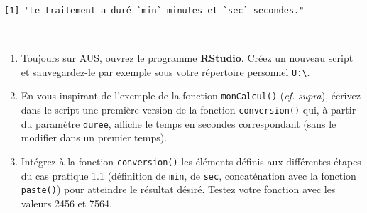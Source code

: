 \documentclass[12pt,twosided, notitlepage]{book}
\newenvironment{Shaded}{}{}
\newcommand{\KeywordTok}[1]{\textcolor[rgb]{0.00,0.00,1.00}{#1}}
\newcommand{\DecValTok}[1]{#1}
\newcommand{\StringTok}[1]{\textcolor[rgb]{0.00,0.50,0.50}{#1}}
\newcommand{\CommentTok}[1]{\textcolor[rgb]{0.00,0.50,0.00}{#1}}
\newcommand{\ControlFlowTok}[1]{\textcolor[rgb]{0.00,0.00,1.00}{#1}}
\newcommand{\NormalTok}[1]{#1}
\newif \ifsol
\renewenvironment{Shaded}{\begin{snugshade}}{\end{snugshade}}
\begin{document}
\begin{verbatim}
[1] "Le traitement a duré `min` minutes et `sec` secondes."
\end{verbatim}

~

\begin{enumerate}
\def\labelenumi{\alph{enumi}.}
\item
  Toujours sur AUS, ouvrez le programme \textbf{RStudio}. Créez un
  nouveau script et sauvegardez-le par exemple sous votre répertoire
  personnel \texttt{U:\textbackslash{}}.
\item
  En vous inspirant de l'exemple de la fonction \texttt{monCalcul()}
  (\emph{cf.} \emph{supra}), écrivez dans le script une première version
  de la fonction \texttt{conversion()} qui, à partir du paramètre
  \texttt{duree}, affiche le temps en secondes correspondant (sans le
  modifier dans un premier temps).

  \ifsol 

  \begin{center} \rule{0.5\linewidth}{\linethickness}\end{center}

\begin{Shaded}
\begin{Highlighting}[]
\CommentTok{# La structure de base d'une définition de fonction est simple :}
\CommentTok{# l'opérateur d'assignation est utilisé pour associer à un nom}
\CommentTok{# le code de la fonction}
\NormalTok{conversion <-}\StringTok{ }\ControlFlowTok{function}\NormalTok{(duree)\{}
  \KeywordTok{return}\NormalTok{(duree)}
\NormalTok{\}}
\CommentTok{# Dans cette première version, on ne fait que renvoyer la valeur}
\CommentTok{# de duree à l'identique.}
\KeywordTok{conversion}\NormalTok{(}\DecValTok{2456}\NormalTok{)}
\NormalTok{  ## [1] 2456}
\end{Highlighting}
\end{Shaded}

  \begin{center} \rule{0.5\linewidth}{\linethickness}\end{center}

  \bigskip  \fi 
\item
  Intégrez à la fonction \texttt{conversion()} les éléments définis aux
  différentes étapes du cas pratique 1.1 (définition de \texttt{min}, de
  \texttt{sec}, concaténation avec la fonction \texttt{paste()}) pour
  atteindre le résultat désiré. Testez votre fonction avec les valeurs
  2456 et 7564.


\end{enumerate}
\end{document}
